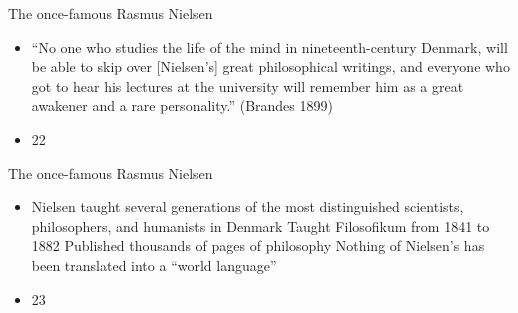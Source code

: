 \documentclass{beamer}
\begin{document}
\begin{frame}{The once-famous Rasmus Nielsen}
\begin{itemize}
  \item “No one who studies the life of the mind in nineteenth-century Denmark, will be able to skip over [Nielsen’s] great philosophical writings, and everyone who got to hear his lectures at the university will remember him as a great awakener and a rare personality.” (Brandes 1899)
  \item 22
\end{itemize}
\end{frame}
\begin{frame}{The once-famous Rasmus Nielsen}
\begin{itemize}
  \item Nielsen taught several generations of the most distinguished scientists, philosophers, and humanists in Denmark
Taught Filosofikum from 1841 to 1882
Published thousands of pages of philosophy
Nothing of Nielsen’s has been translated into a “world language”
  \item 23
\end{itemize}
\end{frame}
\end{document}
